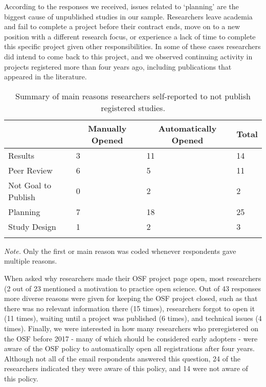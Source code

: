 \documentclass[
  ,jou, a4paper,floatsintext]{apa6}
\begin{document}
According to the responses we received, issues related to `planning' are the biggest cause of unpublished studies in our sample. Researchers leave academia and fail to complete a project before their contract ends, move on to a new position with a different research focus, or experience a lack of time to complete this specific project given other responsibilities. In some of these cases researchers did intend to come back to this project, and we observed continuing activity in projects registered more than four years ago, including publications that appeared in the literature.

\begin{table*}[tbp]

\begin{center}
\begin{threeparttable}

\caption{\label{tab:table-reasons}Summary of main reasons researchers self-reported to not publish registered studies.}

\begin{tabular}{llll}
\toprule
 & \multicolumn{1}{c}{Manually Opened} & \multicolumn{1}{c}{Automatically Opened} & \multicolumn{1}{c}{Total}\\
\midrule
Results & 3 & 11 & 14\\
Peer Review & 6 & 5 & 11\\
Not Goal to Publish & 0 & 2 & 2\\
Planning & 7 & 18 & 25\\
Study Design & 1 & 2 & 3\\
\bottomrule
\addlinespace
\end{tabular}

\begin{tablenotes}[para]
\normalsize{\textit{Note.} Only the first or main reason was coded whenever respondents gave multiple reasons.}
\end{tablenotes}

\end{threeparttable}
\end{center}

\end{table*}

When asked why researchers made their OSF project page open, most researchers (2 out of 23 mentioned a motivation to practice open science. Out of 43 responses more diverse reasons were given for keeping the OSF project closed, such as that there was no relevant information there (15 times), researchers forgot to open it (11 times), waiting until a project was published (6 times), and technical issues (4 times). Finally, we were interested in how many researchers who preregistered on the OSF before 2017 - many of which should be considered early adopters - were aware of the OSF policy to automatically open all registrations after four years. Although not all of the email respondents answered this question, 24 of the researchers indicated they were aware of this policy, and 14 were not aware of this policy.
\end{document}
